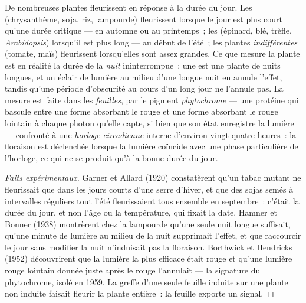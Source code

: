 \begin{proposition}\label{prop:b2:plant-flowering:photoperiod}
De nombreuses plantes fleurissent en réponse à la durée du jour. Les
\emph{} (chrysanthème, soja, riz, lampourde)
fleurissent lorsque le jour est plus court qu'une durée critique --- en
automne ou au printemps~; les \emph{} (épinard,
blé, trèfle, \emph{Arabidopsis}) lorsqu'il est plus long --- au début
de l'été~; les plantes \emph{indifférentes} (tomate, maïs) fleurissent
lorsqu'elles sont assez grandes. Ce que mesure la plante est en réalité
la durée de la \emph{nuit} ininterrompue~: une  est
une plante de nuits longues, et un éclair de lumière au milieu d'une
longue nuit en annule l'effet, tandis qu'une période d'obscurité au
cours d'un long jour ne l'annule pas. La mesure est faite dans les
\emph{feuilles}, par le pigment \emph{phytochrome} --- une protéine qui
bascule entre une forme absorbant le rouge et une forme absorbant le
rouge lointain à chaque photon qu'elle capte, si bien que son état
enregistre la lumière --- confronté à une \emph{horloge circadienne}
interne d'environ vingt-quatre heures~: la floraison est déclenchée
lorsque la lumière coïncide avec une phase particulière de l'horloge,
ce qui ne se produit qu'à la bonne durée du jour.
\end{proposition}
\begin{proof}[Faits expérimentaux]
Garner et Allard (1920) constatèrent qu'un tabac mutant ne fleurissait
que dans les jours courts d'une serre d'hiver, et que des sojas semés à
intervalles réguliers tout l'été fleurissaient tous ensemble en
septembre~: c'était la durée du jour, et non l'âge ou la température,
qui fixait la date. Hamner et Bonner (1938) montrèrent chez la lampourde
qu'une seule nuit longue suffisait, qu'une minute de lumière au milieu
de la nuit supprimait l'effet, et que raccourcir le jour sans modifier
la nuit n'induisait pas la floraison. Borthwick et Hendricks (1952)
découvrirent que la lumière la plus efficace était rouge et qu'une
lumière rouge lointain donnée juste après le rouge l'annulait --- la
signature du phytochrome, isolé en 1959. La greffe d'une seule feuille
induite sur une plante non induite faisait fleurir la plante entière~:
la feuille exporte un signal.
\end{proof}


